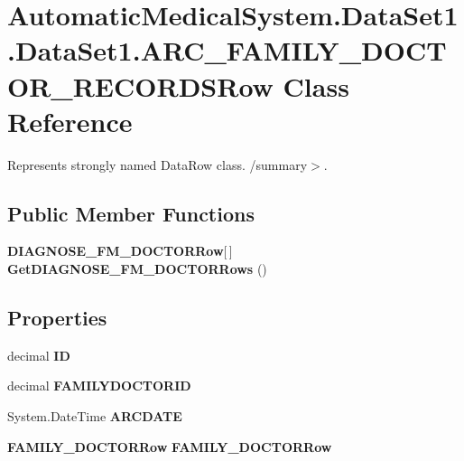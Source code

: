 \section{AutomaticMedicalSystem.DataSet1.DataSet1.ARC\_\-FAMILY\_\-DOCTOR\_\-RECORDSRow Class Reference}
\label{class_automatic_medical_system_1_1_data_set1_1_1_a_r_c___f_a_m_i_l_y___d_o_c_t_o_r___r_e_c_o_r_d_s_row}
Represents strongly named DataRow class. /summary$>$.  


\subsection*{Public Member Functions}
\begin{CompactItemize}
\item 
{\bf DIAGNOSE\_\-FM\_\-DOCTORRow}[$\,$] \textbf{GetDIAGNOSE\_\-FM\_\-DOCTORRows} ()\label{class_automatic_medical_system_1_1_data_set1_1_1_a_r_c___f_a_m_i_l_y___d_o_c_t_o_r___r_e_c_o_r_d_s_row_3897fd686db3fe8e287711a5a44f031d}

\end{CompactItemize}
\subsection*{Properties}
\begin{CompactItemize}
\item 
decimal \textbf{ID}\hspace{0.3cm}{\tt  [get, set]}\label{class_automatic_medical_system_1_1_data_set1_1_1_a_r_c___f_a_m_i_l_y___d_o_c_t_o_r___r_e_c_o_r_d_s_row_65b19bd03c7c957d3095fa8307382847}

\item 
decimal \textbf{FAMILYDOCTORID}\hspace{0.3cm}{\tt  [get, set]}\label{class_automatic_medical_system_1_1_data_set1_1_1_a_r_c___f_a_m_i_l_y___d_o_c_t_o_r___r_e_c_o_r_d_s_row_ebe08faa19b2f7e4fe2ca91fef1479a5}

\item 
System.DateTime \textbf{ARCDATE}\hspace{0.3cm}{\tt  [get, set]}\label{class_automatic_medical_system_1_1_data_set1_1_1_a_r_c___f_a_m_i_l_y___d_o_c_t_o_r___r_e_c_o_r_d_s_row_7f1aa5ca492bbe9fdde8d5054eed3b1b}

\item 
{\bf FAMILY\_\-DOCTORRow} \textbf{FAMILY\_\-DOCTORRow}\hspace{0.3cm}{\tt  [get, set]}\label{class_automatic_medical_system_1_1_data_set1_1_1_a_r_c___f_a_m_i_l_y___d_o_c_t_o_r___r_e_c_o_r_d_s_row_c24f50cadb6da0da170e0a388bed6999}

\end{CompactItemize}


